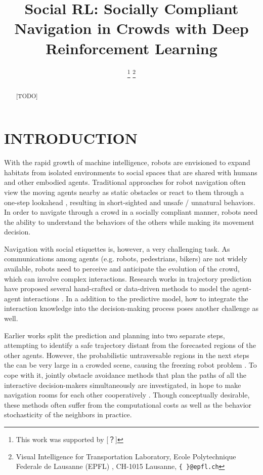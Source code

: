 \documentclass[letterpaper, 10 pt, conference]{ieeeconf}  %
\title{\Large \bf Social RL: Socially Compliant Navigation in Crowds
with Deep Reinforcement Learning}
\author{%
\thanks{This work was supported by [？]}%
\thanks{Visual Intelligence for Transportation Laboratory, Ecole Polytechnique Federale de Lausanne (EPFL)
, CH-1015 Lausanne,
        {\tt\small \{ \}@epfl.ch}}%
}
\begin{document}

\maketitle
\thispagestyle{empty}
\pagestyle{empty}

\begin{abstract}
[TODO]
\vspace{3cm}

\end{abstract}


\section{INTRODUCTION} \label{sec:intro}

With the rapid growth of machine intelligence, robots are envisioned to expand habitats from isolated environments to social spaces that are shared with humans and other embodied agents. Traditional approaches for robot navigation often view the moving agents nearby as static obstacles \cite{fox_dynamic_1997} or react to them through a one-step lookahead \cite{berg_reciprocal_2008}, resulting in short-sighted and unsafe / unnatural behaviors. In order to navigate through a crowd in a socially compliant manner, robots need the ability to understand the behaviors of the others while making its movement decision. 

Navigation with social etiquettes is, however, a very challenging task. As communications among agents (e.g. robots, pedestrians, bikers) are not widely available, robots need to perceive and anticipate the evolution of the crowd, which can involve complex interactions. Research works in trajectory prediction have proposed several hand-crafted or data-driven methods to model the agent-agent interactions \cite{helbing_social_1995,alahi_social_2016,vemula_social_2017,gupta_social_2018}. In a addition to the predictive model, how to integrate the interaction knowledge into the decision-making process poses another challenge as well. 

Earlier works split the prediction and planning into two separate steps, attempting to identify a safe trajectory distant from the forecasted regions of the other agents\cite{bennewitz_learning_2005,aoude_probabilistically_2013}. However, the probabilistic untraversable regions in the next steps the can be very large in a crowded scene, causing the freezing robot problem \cite{trautman_unfreezing_2010}. To cope with it, jointly obstacle avoidance methods that plan the paths of all the interactive decision-makers simultaneously are investigated, in hope to make navigation rooms for each other cooperatively \cite{trautman_unfreezing_2010}. Though conceptually desirable, these methods often suffer from the computational costs as well as the behavior stochasticity of the neighbors in practice. 
\end{document}
